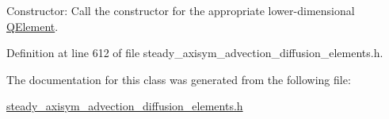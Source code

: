 Constructor\+: Call the constructor for the appropriate lower-\/dimensional \hyperlink{classoomph_1_1QElement}{Q\+Element}. 



Definition at line 612 of file steady\+\_\+axisym\+\_\+advection\+\_\+diffusion\+\_\+elements.\+h.



The documentation for this class was generated from the following file\+:\begin{DoxyCompactItemize}
\item 
\hyperlink{steady__axisym__advection__diffusion__elements_8h}{steady\+\_\+axisym\+\_\+advection\+\_\+diffusion\+\_\+elements.\+h}\end{DoxyCompactItemize}
